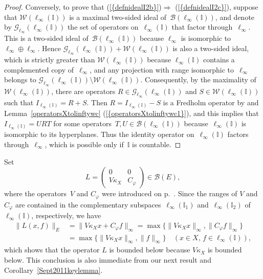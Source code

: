 \documentclass[12pt]{amsart}
\theoremstyle{definition}
\numberwithin{equation}{section}
\begin{document}
\begin{proof}
  Conversely, to prove that {{\normalfont\textrm{(\ref{{defnidealI2b}})}}}$\Rightarrow$  {{\normalfont\textrm{(\ref{{defnidealI2c}})}}}, suppose that
  $\mathscr{W}(\ell_\infty(\mathbb{I}))$ is a maximal two-sided ideal
  of~$\mathscr{B}(\ell_\infty(\mathbb{I}))$, and denote by
  $\mathscr{G}_{\ell_\infty}(\ell_\infty(\mathbb{I}))$ the set of
  operators on~$\ell_\infty(\mathbb{I})$ that factor
  through~$\ell_\infty$. This is a two-sided ideal
  of~$\mathscr{B}(\ell_\infty(\mathbb{I}))$ because $\ell_\infty$ is
  isomorphic to \mbox{$\ell_\infty\oplus\ell_\infty$}. Hence
  $\mathscr{G}_{\ell_\infty}(\ell_\infty(\mathbb{I})) +
  \mathscr{W}(\ell_\infty(\mathbb{I}))$ is also a two-sided ideal,
  which is strictly greater than
  $\mathscr{W}(\ell_\infty(\mathbb{I}))$ because
  $\ell_\infty(\mathbb{I})$ contains a complemented copy
  of~$\ell_\infty$, and any projection with range isomorphic
  to~$\ell_\infty$ belongs to
  $\mathscr{G}_{\ell_\infty}(\ell_\infty(\mathbb{I}))\setminus
  \mathscr{W}(\ell_\infty(\mathbb{I}))$. Con\-sequent\-ly, by the
  maximality of~$\mathscr{W}(\ell_\infty(\mathbb{I}))$, there are
  operators $R\in\mathscr{G}_{\ell_\infty}(\ell_\infty(\mathbb{I}))$
  and $S\in \mathscr{W}(\ell_\infty(\mathbb{I}))$ such that
  $I_{\ell_\infty(\mathbb{I})} = R+S$.  Then $R =
  I_{\ell_\infty(\mathbb{I})}-S$ is a Fredholm operator by
  \cite[Proposition~2.c.10]{lt1} and Lemma~\ref{operatorsXtolinftywc}  {{\normalfont\textrm{(\ref{{operatorsXtolinftywc1}})}}}, and this implies that
  $I_{\ell_\infty(\mathbb{I})} = URT$ for some
  operators~$T,U\in\mathscr{B}(\ell_\infty(\mathbb{I}))$
  because~$\ell_\infty(\mathbb{I})$ is isomorphic to its
  hyper\-planes. Thus the identity operator on~$\ell_\infty(\mathbb{I})$
  factors through~$\ell_\infty$, which is possible only
  if~$\mathbb{I}$ is countable.
\end{proof}

Set \begin{equation}\label{defnL} L = \begin{pmatrix} 0 & 0\\
    V\kappa_X & C_{\ensuremath{\varphi}} \end{pmatrix}\in\mathscr{B}(E), \end{equation}
where the operators~$V$ and $C_{\ensuremath{\varphi}}$ were introduced on
p.~\pageref{assumption1}.  Since the ranges of $V$ and~$C_{\ensuremath{\varphi}}$ are
contained in the complementary subspaces~$\ell_\infty(\mathbb{I}_1)$
and~$\ell_\infty(\mathbb{I}_2)$ of~$\ell_\infty(\mathbb{I})$,
respectively, we have
\begin{align*}
  \|L(x,f)\|_E &= \|V\kappa_X x + C_{\ensuremath{\varphi}} f\|_\infty  =
  \max\bigl\{\|V\kappa_X x\|_\infty,\| C_{\ensuremath{\varphi}}
  f\|_\infty\bigr\}\\ &= \max\bigl\{\|V\kappa_X
  x\|_\infty,\|f\|_\infty\bigr\}\quad
  (x\in X,\,f\in\ell_\infty(\mathbb{I})),
\end{align*}
which shows that the operator $L$ is bounded below because $V\kappa_X$
is bounded below.  This conclusion is also immediate from our next
result and Corollary~\ref{Sept2011keylemma}.
\end{document}
